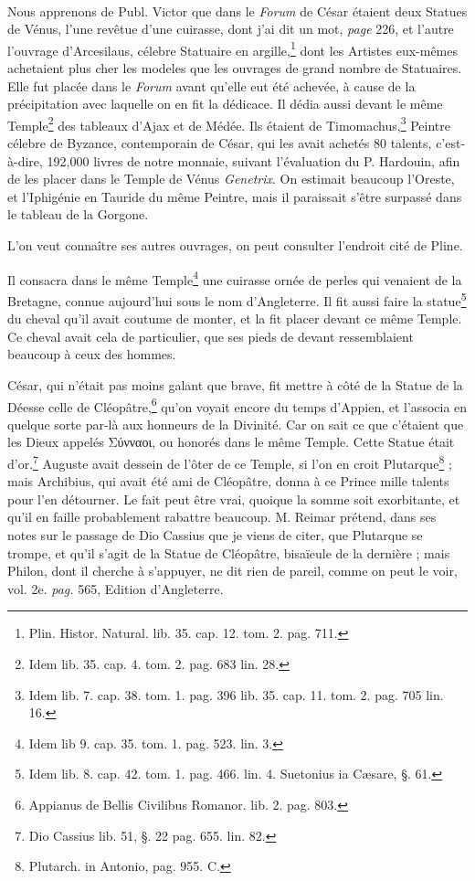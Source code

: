 \documentclass[a4paper, 11pt, oneside, polutonikogreek, french]{article}
\begin{document}
\paragraph{}
Nous apprenons de Publ. Victor que dans le \emph{Forum} de César étaient deux Statues de Vénus, l'une revêtue d'une cuirasse, dont j'ai dit un mot, \emph{page} 226, et l'autre l'ouvrage d'Arcesilaus, célebre Statuaire en argille,\footnote{Plin. Histor. Natural. lib. 35. cap. 12. tom. 2. pag. 711.} dont les Artistes eux-mêmes achetaient plus cher les modeles que les ouvrages de grand nombre de Statuaires. Elle fut placée dans le \emph{Forum} avant qu'elle eut été achevée, à cause de la précipitation avec laquelle on en fit la dédicace. Il dédia aussi devant le même Temple\footnote{Idem lib. 35. cap. 4. tom. 2. pag. 683 lin. 28.} des tableaux d'Ajax et de Médée. Ils étaient de Timomachus,\footnote{Idem lib. 7. cap. 38. tom. 1. pag. 396 lib. 35. cap. 11. tom. 2. pag. 705 lin. 16.} Peintre célebre de Byzance, contemporain de César, qui les avait achetés 80 talents, c'est-à-dire, 192,000 livres de notre monnaie, suivant l'évaluation du P. Hardouin, afin de les placer dans le Temple de Vénus \emph{Genetrix}. On estimait beaucoup l'Oreste, et l'Iphigénie en Tauride du même Peintre, mais il paraissait s'être surpassé dans le tableau de la Gorgone.

L'on veut connaître ses autres ouvrages, on peut consulter l'endroit cité de Pline.

Il consacra dans le même Temple\footnote{Idem lib 9. cap. 35. tom. 1. pag. 523. lin. 3.} une cuirasse ornée de perles qui venaient de la Bretagne, connue aujourd'hui sous le nom d'Angleterre. Il fit aussi faire la statue\footnote{Idem lib. 8. cap. 42. tom. 1. pag. 466. lin. 4. Suetonius ia Cæsare, §. 61.} du cheval qu'il avait coutume de monter, et la fit placer devant ce même Temple. Ce cheval avait cela de particulier, que ses pieds de devant ressemblaient beaucoup à ceux des hommes.

César, qui n'était pas moins galant que brave, fit mettre à côté de la Statue de la Déesse celle de Cléopâtre,\footnote{Appianus de Bellis Civilibus Romanor. lib. 2. pag. 803.} qu'on voyait encore du temps d'Appien, et l'associa en quelque sorte par-là aux honneurs de la Divinité. Car on sait ce que c'étaient que les Dieux appelés Σύνναοι, ou honorés dans le même Temple. Cette Statue était d'or.\footnote{Dio Cassius lib. 51, §. 22 pag. 655. lin. 82.} Auguste avait dessein de l'ôter de ce Temple, si l'on en croit Plutarque\footnote{Plutarch. in Antonio, pag. 955. C.} ; mais Archibius, qui avait été ami de Cléopâtre, donna à ce Prince mille talents pour l'en détourner. Le fait peut être vrai, quoique la somme soit exorbitante, et qu'il en faille probablement rabattre beaucoup. M. Reimar prétend, dans ses notes sur le passage de Dio Cassius que je viens de citer, que Plutarque se trompe, et qu'il s'agit de la Statue de Cléopâtre, bisaïeule de la dernière ; mais Philon, dont il cherche à s'appuyer, ne dit rien de pareil, comme on peut le voir, vol. 2e. \emph{pag.} 565, Edition d'Angleterre.
\end{document}
